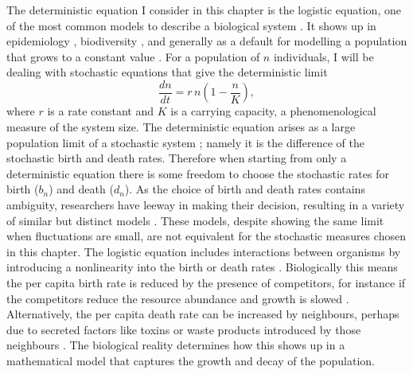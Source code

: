 The deterministic equation I consider in this chapter is the logistic equation, one of the most common models to describe a biological system \cite{Greenhalgh1990,Ovaskainen2010,Assaf2010,Allen2003a,Norden1982,Newman2004,Allen2005,Fujita1953,Nasell2001}. 
It shows up in epidemiology \cite{Assaf2009,others?}, biodiversity \cite{Hubbell2001?,others?}, and generally as a default for modelling a population that grows to a constant value \cite{bacteria OD, eg}. %
For a population of $n$ individuals, I will be dealing with stochastic equations that give the deterministic limit
\begin{equation}
\frac{dn}{dt} = r\,n\left(1-\frac{n}{K}\right),
\label{logistic}
\end{equation}
where $r$ is a rate constant and $K$ is a carrying capacity, a phenomenological measure of the system size. 
The deterministic equation arises as a large population limit of a stochastic system \cite{Nisbet1982,Gardiner2004,Rouzine2001}; namely it is the difference of the stochastic birth and death rates. 
Therefore when starting from only a deterministic equation there is some freedom to choose the stochastic rates for birth ($b_n$) and death ($d_n$). 
As the choice of birth and death rates contains ambiguity, researchers have leeway in making their decision, resulting in a variety of similar but distinct models \cite{Greenhalgh1990,Ovaskainen2010,Assaf2010,Allen2003a,Norden1982,Newman2004,Allen2005,Fujita1953,Nasell2001}. 
These models, despite showing the same limit when fluctuations are small, are not equivalent for the stochastic measures chosen in this chapter. 
%
The logistic equation includes interactions between organisms by introducing a nonlinearity into the birth or death rates \cite{Greenhalgh1990,Ovaskainen2010,Assaf2010,Allen2003a,Norden1982,Newman2004,Allen2005,Fujita1953,Nasell2001}. 
Biologically this means the per capita birth rate is reduced by the presence of competitors, for instance if the competitors reduce the resource abundance and growth is slowed \cite{Nadell2008,Vulic2001}. 
Alternatively, the per capita death rate can be increased by neighbours, perhaps due to secreted factors like toxins or waste products introduced by those neighbours \cite{Greenhalgh1990,VanMelderen2009,Rankin2012}. 
The biological reality determines how this shows up in a mathematical model that captures the growth and decay of the population. 

